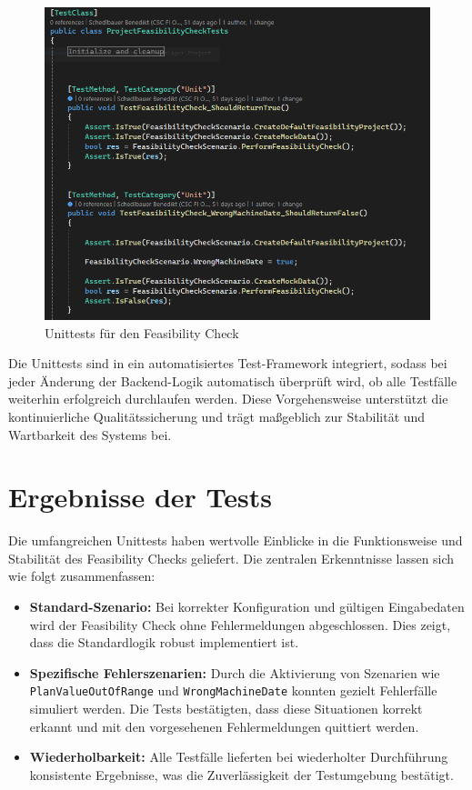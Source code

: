 \begin{figure}[!htb]
    \centering
    \includegraphics[width=1\textwidth]{bilder/unittestcases.png}
    \caption{Unittests für den Feasibility Check}
    \label{fig:unittestcases}
\end{figure}

Die Unittests sind in ein automatisiertes Test-Framework integriert, sodass bei jeder Änderung der Backend-Logik automatisch überprüft wird, ob alle Testfälle weiterhin erfolgreich durchlaufen werden. Diese Vorgehensweise unterstützt die kontinuierliche Qualitätssicherung und trägt maßgeblich zur Stabilität und Wartbarkeit des Systems bei.

\section{Ergebnisse der Tests}

Die umfangreichen Unittests haben wertvolle Einblicke in die Funktionsweise und Stabilität des Feasibility Checks geliefert. Die zentralen Erkenntnisse lassen sich wie folgt zusammenfassen:

\begin{itemize}
    \item \textbf{Standard-Szenario:} Bei korrekter Konfiguration und gültigen Eingabedaten wird der Feasibility Check ohne Fehlermeldungen abgeschlossen. Dies zeigt, dass die Standardlogik robust implementiert ist.
    \item \textbf{Spezifische Fehlerszenarien:} Durch die Aktivierung von Szenarien wie \texttt{PlanValueOutOfRange} und \texttt{WrongMachineDate} konnten gezielt Fehlerfälle simuliert werden. Die Tests bestätigten, dass diese Situationen korrekt erkannt und mit den vorgesehenen Fehlermeldungen quittiert werden.
    \item \textbf{Wiederholbarkeit:} Alle Testfälle lieferten bei wiederholter Durchführung konsistente Ergebnisse, was die Zuverlässigkeit der Testumgebung bestätigt.
\end{itemize}


